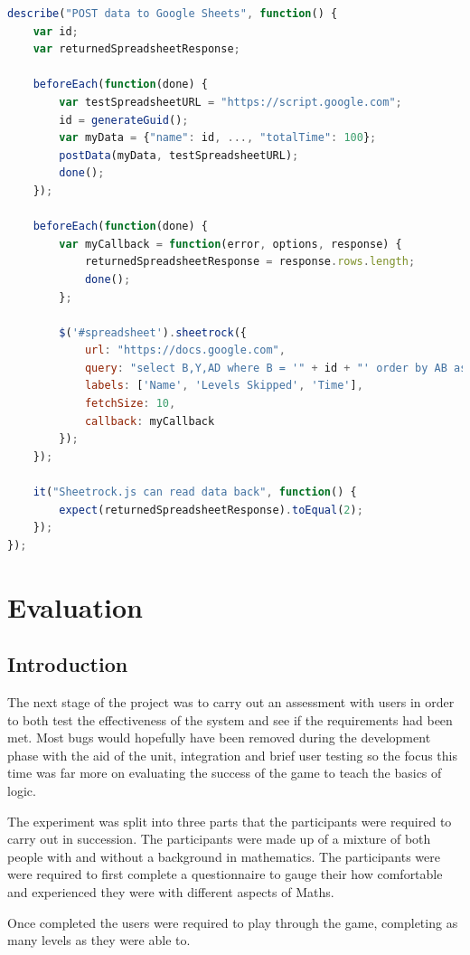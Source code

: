 \documentclass[12pt,a4paper]{report}
\begin{document}
\begin{lstlisting}[language=JavaScript]
describe("POST data to Google Sheets", function() {
    var id;
    var returnedSpreadsheetResponse;

    beforeEach(function(done) {
        var testSpreadsheetURL = "https://script.google.com";
        id = generateGuid();
        var myData = {"name": id, ..., "totalTime": 100};
        postData(myData, testSpreadsheetURL);
        done();
    });

    beforeEach(function(done) {
        var myCallback = function(error, options, response) {
            returnedSpreadsheetResponse = response.rows.length;
            done();
        };

        $('#spreadsheet').sheetrock({
            url: "https://docs.google.com",
            query: "select B,Y,AD where B = '" + id + "' order by AB asc",
            labels: ['Name', 'Levels Skipped', 'Time'],
            fetchSize: 10,
            callback: myCallback
        });
    });

    it("Sheetrock.js can read data back", function() {
        expect(returnedSpreadsheetResponse).toEqual(2);
    });
});
\end{lstlisting}

\chapter{Evaluation}

\section{Introduction}
The next stage of the project was to carry out an assessment with users in order to both test the effectiveness of the system and see if the requirements had been met. Most bugs would hopefully have been removed during the development phase with the aid of the unit, integration and brief user testing so the focus this time was far more on evaluating the success of the game to teach the basics of logic.

The experiment was split into three parts that the participants were required to carry out in succession. The participants were made up of a mixture of both people with and without a background in mathematics.
The participants were were required to first complete a questionnaire to gauge their how comfortable and experienced they were with different aspects of Maths.

Once completed the users were required to play through the game, completing as many levels as they were able to. 
\end{document}
